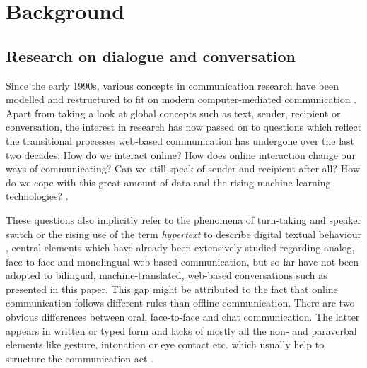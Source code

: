 \documentclass[output=paper]{langscibook}
\begin{document}

\section{Background}
\label{sec:background}

\subsection{Research on dialogue and conversation}
\label{subsec:research}

    Since the early 1990s, various concepts in communication research have been modelled and restructured to fit on modern computer-mediated communication \citep[cf.][7]{fiser_investigating_2017}. Apart from taking a look at global concepts such as text, sender, recipient or conversation, the interest in research has now passed on to questions which reflect the transitional processes web-based communication has undergone over the last two decades: How do we interact online? How does online interaction change our ways of communicating? Can we still speak of sender and recipient after all? How do we cope with this great amount of data and the rising machine learning technologies? \citep[cf.][]{beiswenger_sprachhandlungskoordination_2007}.
    
    These questions also implicitly refer to the phenomena of turn-taking and speaker switch or the rising use of the term \textit{hypertext} to describe digital textual behaviour \citep[cf.][]{storrer_sprachliche_2001}, central elements which have already been extensively studied regarding analog, face-to-face and monolingual web-based communication, but so far have not been adopted to bilingual, machine-translated, web-based conversations such as presented in this paper. This gap might be attributed to the fact that online communication follows different rules than offline communication.
    There are two obvious differences between oral, face-to-face and chat communication. The latter appears in written or typed form and lacks of mostly all the non- and paraverbal elements like gesture, intonation or eye contact etc. which usually help to structure the communication act \citep[cf.][172]{beiswenger_sprachhandlungskoordination_2007}.
    
\end{document}
